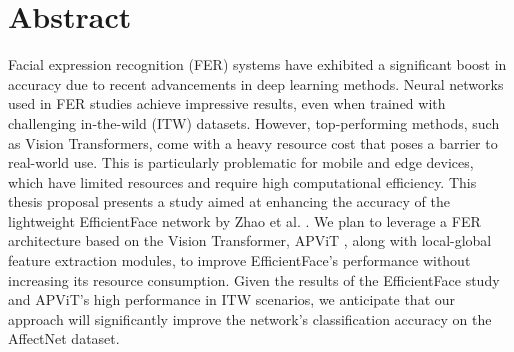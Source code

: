 \section*{Abstract}

Facial expression recognition (FER) systems have exhibited a significant boost in accuracy due to recent advancements in deep learning methods. 
Neural networks used in FER studies achieve impressive results, even when trained with challenging in-the-wild (ITW) datasets. 
However, top-performing methods, such as Vision Transformers, come with a heavy resource cost that poses a barrier to real-world use. 
This is particularly problematic for mobile and edge devices, which have limited resources and require high computational efficiency. 
This thesis proposal presents a study aimed at enhancing the accuracy of the lightweight EfficientFace network by Zhao et al. \cite{eff-face2021}.
We plan to leverage a FER architecture based on the Vision Transformer, APViT \cite{apvit2023}, along with local-global feature extraction modules, to improve EfficientFace’s performance without increasing its resource consumption. 
Given the results of the EfficientFace study \cite{eff-face2021} and APViT’s high performance in ITW scenarios, we anticipate that our approach will significantly improve the network’s classification accuracy on the AffectNet dataset.